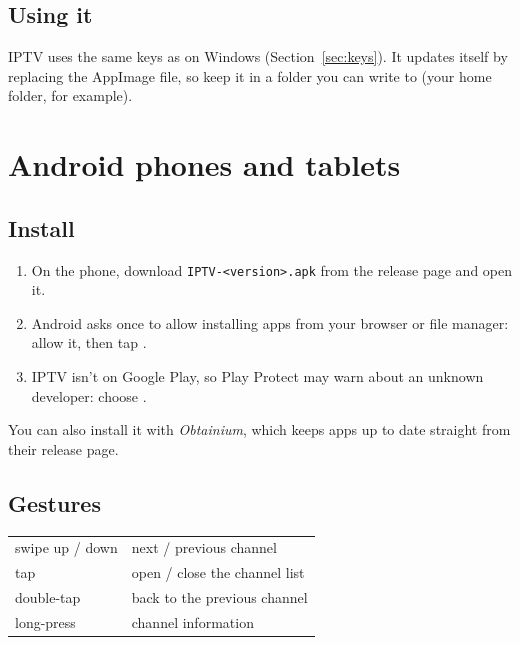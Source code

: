 
\subsection{Using it}
IPTV uses the same keys as on Windows (Section~\ref{sec:keys}). It updates
itself by replacing the AppImage file, so keep it in a folder you can write
to (your home folder, for example).

\section{Android phones and tablets}

\subsection{Install}
\begin{enumerate}
  \item On the phone, download \texttt{IPTV-\textless version\textgreater.apk}
        from the release page and open it.
  \item Android asks once to allow installing apps from your browser or file
        manager: allow it, then tap .
  \item IPTV isn't on Google Play, so Play Protect may warn about an unknown
        developer: choose .
\end{enumerate}
You can also install it with \emph{Obtainium}, which keeps apps up to date
straight from their release page.

\subsection{Gestures}
\begin{xltabular}{\linewidth}{@{}KX@{}}
swipe up / down & next / previous channel \\
tap & open / close the channel list \\
double-tap & back to the previous channel \\
long-press & channel information \\
\bottomrule
\end{xltabular}

